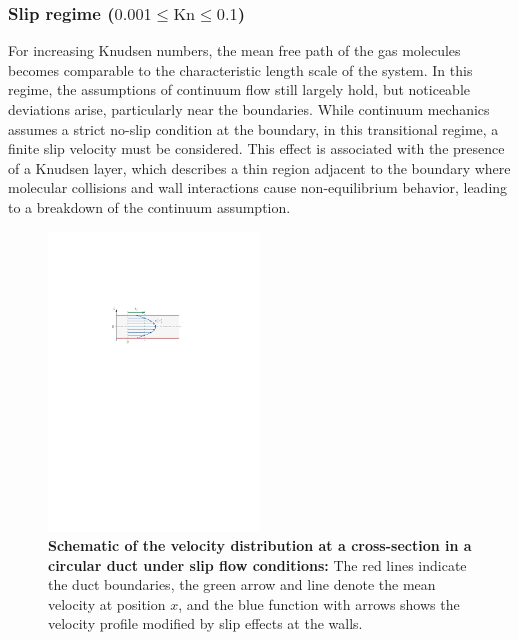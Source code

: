 \subsubsection*{Slip regime ($0.001 \leq \mathrm{Kn} \leq 0.1$)}
	For increasing Knudsen numbers, the mean free path of the gas molecules becomes comparable to the characteristic length scale of the system.
	In this regime, the assumptions of continuum flow still largely hold, but noticeable deviations arise, particularly near the boundaries.
	While continuum mechanics assumes a strict no-slip condition at the boundary, in this transitional regime, a finite slip velocity must be considered.
	This effect is associated with the presence of a Knudsen layer, which describes a thin region adjacent to the boundary where molecular collisions and wall interactions cause non-equilibrium behavior, leading to a breakdown of the continuum assumption.
	\begin{figure}[H]
	    \centering
	    \includegraphics[width=0.5\textwidth]{src/02_foundations/fig_slip-regime.pdf}
		\caption[Schematic of the velocity distribution at a cross-section in a circular duct under slip flow conditions.]{
			\textbf{Schematic of the velocity distribution at a cross-section in a circular duct under slip flow conditions:}
			The red lines indicate the duct boundaries, the green arrow and line denote the mean velocity at position $x$, and the blue function with arrows shows the velocity profile modified by slip effects at the walls. \cite{Cengel2017}
		}
		\label{fig:slip-flow}
	\end{figure}

